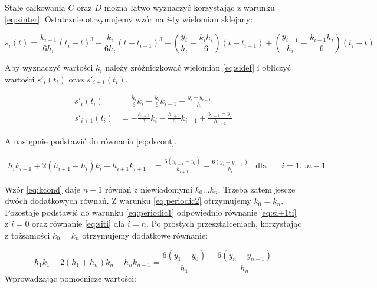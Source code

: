 \documentclass[11pt,wide]{mwart}
\begin{document}
Stałe całkowania $ C $ oraz $ D $ można łatwo wyznaczyć korzystając z warunku \eqref{eq:sinter}. Ostatcznie otrzymujemy wzór na $ i $-ty wielomian sklejany:

\begin{equation}
	s_i(t) = \frac{k_{i-1}}{6h_{i}}(t_{i} - t)^3 + \frac{k_{i}}{6h_{i}}(t - t_{i-1})^3 + (\frac{y_{i}}{h_{i}} - \frac{k_{i}h_{i}}{6})(t - t_{i-1}) + (\frac{y_{i-1}}{h_{i}} - \frac{k_{i-1}h_{i}}{6})(t_{i} - t) \label{eq:sidef}
\end{equation} 

Aby wyznaczyć wartości $ k_i $ należy zróżniczkować wielomian \eqref{eq:sidef} i obliczyć wartości $ s'_i(t_i) $ oraz $ s'_{i+1}(t_i)$.

\begin{align}
	s'_i(t_i) &= \frac{h_{i}}{3}k_i + \frac{h_{i}}{6}k_{i-1} + \frac{y_i - y_{i-1}}{h_{i}} \label{eq:siti}\\
	s'_{i+1}(t_i) &= - \frac{h_{i+1}}{3}k_{i} - \frac{h_{i+1}}{6}k_{i+1} + \frac{y_{i+1} - y_i}{h_{i+1}} \label{eq:si+1ti}
\end{align} 

A następnie podstawić do równania \eqref{eq:dscont}.

\begin{align}
	h_ik_{i-1} + 2(h_{i+1} + h_i)k_i + h_{i+1}k_{i+1} &= \frac{6(y_{i+1} - y_i)}{h_{i+1}} - \frac{6(y_{i} - y_{i-1})}{h_{i}} & \text{dla} \quad & i = 1 \ldots n-1 \label{eq:kcond}
\end{align}

Wzór \eqref{eq:kcond} daje $ n-1 $ równań z niewiadomymi $ k_0 \ldots k_n $. Trzeba zatem jescze dwóch dodatkowych równań. Z warunku \eqref{eq:periodic2} otrzymujemy $ k_0 = k_n $. Pozostaje podstawić do warunku \eqref{eq:periodic1} odpowiednio równanie \eqref{eq:si+1ti} z $ i = 0 $ oraz równanie \eqref{eq:siti} dla $ i = n $. Po prostych przeształceniach, korzystając z tożsamości $ k_0 = k_n $ otrzymujemy dodatkowe równanie:

\begin{equation}
	h_1k_1 + 2(h_1 + h_n)k_n + h_{n}k_{n-1} = \frac{6(y_1 - y_0)}{h_1} - \frac{6(y_n - y_{n-1})}{h_n}
\end{equation}
Wprowadzając pomocnicze wartości:
\end{document}
